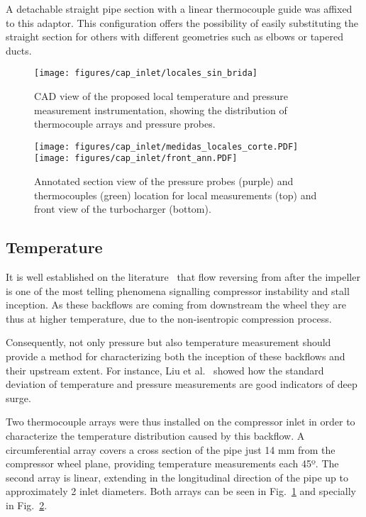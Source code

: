 A detachable straight pipe section with a linear thermocouple guide was affixed to this adaptor. This configuration offers the possibility of easily substituting the straight section for others with different geometries such as elbows or tapered ducts.

\begin{figure}[htb!]
\centering
\texttt{[image: figures/cap\_inlet/locales\_sin\_brida]}
\caption[CAD view of the local measurement instrumentation]{CAD view of the proposed local temperature and pressure measurement instrumentation, showing the distribution of thermocouple arrays and pressure probes.}
\label{fig:metod_local_meas}
\end{figure}

\begin{figure}[b!]
\centering
\texttt{[image: figures/cap\_inlet/medidas\_locales\_corte.PDF]}
\texttt{[image: figures/cap\_inlet/front\_ann.PDF]}
\caption[Annotated views of the instrumented compressor]{Annotated section view of the pressure probes (purple) and thermocouples (green) location for local measurements (top) and front view of the turbocharger (bottom).}
\label{fig:metod_local_meas_dimen}
\end{figure}

\subsection{Temperature}

It is well established on the literature~\cite{koff1986axisymmetrically,galindo2008experiments} that flow reversing from after the impeller is one of the most telling phenomena signalling compressor instability and stall inception. As these backflows are coming from downstream the wheel they are thus at higher temperature, due to the non-isentropic compression process.

Consequently, not only pressure but also temperature measurement should provide a method for characterizing both the inception of these backflows and their upstream extent. For instance, Liu et al.~\cite{liu2013methods} showed how the standard deviation of temperature and pressure measurements are good indicators of deep surge.

Two thermocouple arrays were thus installed on the compressor inlet in order to characterize the temperature distribution caused by this backflow. A circumferential array covers a cross section of the pipe just 14 mm from the compressor wheel plane, providing temperature measurements each 45º. The second array is linear, extending in the longitudinal direction of the pipe up to approximately 2 inlet diameters. Both arrays can be seen in Fig.~\ref{fig:metod_local_meas} and specially in Fig.~\ref{fig:metod_local_meas_dimen}.

